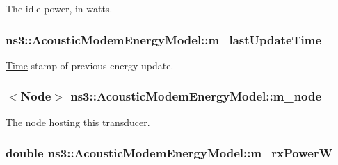 The idle power, in watts. 

\subsubsection[{\texorpdfstring{m\+\_\+last\+Update\+Time}{m_lastUpdateTime}}]{ ns3\+::\+Acoustic\+Modem\+Energy\+Model\+::m\+\_\+last\+Update\+Time\hspace{0.3cm}{\ttfamily [private]}}\hypertarget{classns3_1_1AcousticModemEnergyModel_a2f87b6c71b37c55d369b0fffc8818765}{}\label{classns3_1_1AcousticModemEnergyModel_a2f87b6c71b37c55d369b0fffc8818765}


\hyperlink{classns3_1_1Time}{Time} stamp of previous energy update. 

\subsubsection[{\texorpdfstring{m\+\_\+node}{m_node}}]{$<${\bf Node}$>$ ns3\+::\+Acoustic\+Modem\+Energy\+Model\+::m\+\_\+node\hspace{0.3cm}{\ttfamily [private]}}\hypertarget{classns3_1_1AcousticModemEnergyModel_af88231291cb4fe9dd914ac4b336d168b}{}\label{classns3_1_1AcousticModemEnergyModel_af88231291cb4fe9dd914ac4b336d168b}


The node hosting this transducer. 

\subsubsection[{\texorpdfstring{m\+\_\+rx\+PowerW}{m_rxPowerW}}]{\setlength{\rightskip}{0pt plus 5cm}double ns3\+::\+Acoustic\+Modem\+Energy\+Model\+::m\+\_\+rx\+PowerW\hspace{0.3cm}{\ttfamily [private]}}\hypertarget{classns3_1_1AcousticModemEnergyModel_a1d81af5908e48e1e9c995306ab19d9bd}{}\label{classns3_1_1AcousticModemEnergyModel_a1d81af5908e48e1e9c995306ab19d9bd}


